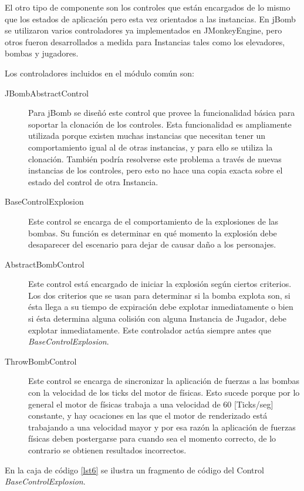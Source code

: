 \documentclass[a4paper,12pt,openany,oneside]{book}
\begin{document}
El otro tipo de componente son los controles que están encargados de lo mismo que los estados de aplicación pero esta vez orientados a las instancias. En jBomb se utilizaron varios controladores ya implementados en JMonkeyEngine, pero otros fueron desarrollados a medida para Instancias tales como los elevadores, bombas y jugadores.

Los controladores incluidos en el módulo común son:
\begin{description}
\item[JBombAbstractControl] Para jBomb se diseñó este control que provee la funcionalidad básica para soportar la clonación de los controles. Esta funcionalidad es ampliamente utilizada porque existen muchas instancias que necesitan tener un comportamiento igual al de otras instancias, y para ello se utiliza la clonación. También podría resolverse este problema a través de nuevas instancias de los controles, pero esto no hace una copia exacta sobre el estado del control de otra Instancia.
\item[BaseControlExplosion] Este control se encarga de el comportamiento de la explosiones de las bombas. Su función es determinar en qué momento la explosión debe desaparecer del escenario para dejar de causar daño a los personajes.
\item[AbstractBombControl] Este control está encargado de iniciar la explosión según ciertos criterios. Los dos criterios que se usan para determinar si la bomba explota son, si ésta llega a su tiempo de expiración debe explotar inmediatamente o bien si ésta determina alguna colisión con alguna Instancia de Jugador, debe explotar inmediatamente. Este controlador actúa siempre antes que \textit{BaseControlExplosion}.
\item[ThrowBombControl] Este control se encarga de sincronizar la aplicación de fuerzas a las bombas con la velocidad de los ticks del motor de físicas. Esto sucede porque por lo general el motor de físicas trabaja a una velocidad de 60 [Ticks/seg] constante, y hay ocaciones en las que el motor de renderizado está trabajando a una velocidad mayor y por esa razón la aplicación de fuerzas físicas deben postergarse para cuando sea el momento correcto, de lo contrario se obtienen resultados incorrectos.
\end{description}
\newpage
En la caja de código \ref{lst6} se ilustra un fragmento de código del Control \textit{BaseControlExplosion}.
\end{document}
